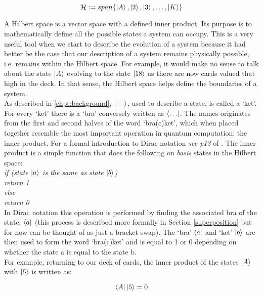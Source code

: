 \begin{equation}
\mathcal{H}:=span\{\left\vert{A}\right\rangle, \left\vert{2}\right\rangle, \left\vert{3}\right\rangle,\ldots ,\left\vert{K}\right\rangle\}
\end{equation}

A Hilbert space is a vector space with a defined inner product. Its purpose is to mathematically define all the possible states a system can occupy. This is a very useful tool when we start to describe the evolution of a system because it had better be the case that our description of a system remains physically possible, i.e. remains within the Hilbert space. For example, it would make no sense to talk about the state $\left\vert{A}\right\rangle$ evolving to the state $\left\vert{18}\right\rangle$ as there are now cards valued that high in the deck. In that sense, the Hilbert space helps define the boundaries of a system.\\

As described in \autoref{chpt:background}, $\left\vert{\ldots}\right\rangle$, used to describe a state, is called a `ket'. For every `ket' there is a `bra' conversely written as $\left\langle{\ldots}\right\vert$. The names originates from the first and second halves of the word `bra(c)ket', which when placed together resemble the most important operation in quantum computation: the inner product. For a formal introduction to Dirac notation \textit{see p13} of \cite{nielsen_chuang_2010}. The inner product is a simple function that does the following on \textit{basis} states in the Hilbert space:\\

\textit{if (state $\left\vert{a}\right\rangle$ is the same as state $\left\vert{b}\right\rangle$)\\ 
    return 1 \\
else \\
    return 0}\\ 

In Dirac notation this operation is performed by finding the associated bra of the state, $\left\langle{a}\right\vert$ (this process is described more formally in Section \autoref{superposition} but for now can be thought of as just a bracket swap). The `bra' $\left\langle{a}\right\vert$ and `ket' $\left\vert{b}\right\rangle$ are then used to form the word `bra(c)ket' and is equal to 1 or 0 depending on whether the state a is equal to the state b.\\

For example, returning to our deck of cards, the inner product of the states $\left\vert{A}\right\rangle$ with $\left\vert{5}\right\rangle$ is written as:

\begin{equation}\label{Example_Inner_Product}
\left\langle{A}\right\vert\left\vert{5}\right\rangle = 0
\end{equation}

